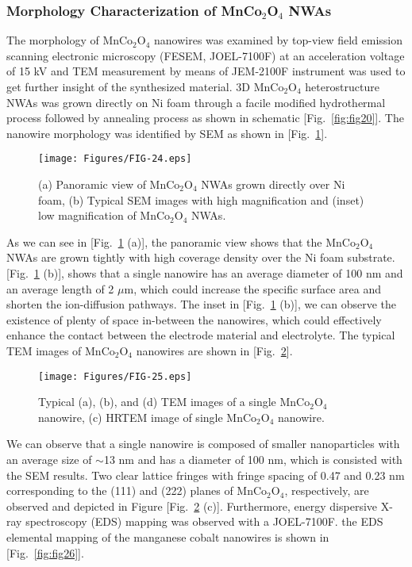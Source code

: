 \documentclass[reprint,amsmath,amssymb,aps,floatfix,
]{revtex4-2}
\begin{document}
\subsubsection{Morphology Characterization of MnCo$_2$O$_4$ NWAs}
The morphology of MnCo$_2$O$_4$ nanowires was examined by top-view field emission scanning electronic microscopy (FESEM, JOEL-7100F) at an acceleration voltage of 15 kV and TEM measurement by means of JEM-2100F instrument was used to get further insight of the synthesized material. 3D MnCo$_2$O$_4$ heterostructure NWAs was grown directly on Ni foam through a facile modified hydrothermal process followed by annealing process as shown in schematic [Fig.~\ref{fig:fig20}]. The nanowire morphology was identified by SEM as shown in [Fig.~\ref{fig:fig24}].
\begin{figure}[b]
    \centering
    \texttt{[image: Figures/FIG-24.eps]}
    \caption{\label{fig:fig24}(a) Panoramic view of MnCo$_2$O$_4$ NWAs grown directly over Ni foam, (b) Typical SEM images with high magnification and (inset) low magnification of MnCo$_2$O$_4$ NWAs.}
    \end{figure}
As we can see in [Fig.~\ref{fig:fig24} (a)], the panoramic view shows that the MnCo$_2$O$_4$ NWAs are grown tightly with high coverage density over the Ni foam substrate. [Fig.~\ref{fig:fig24} (b)], shows that a single nanowire has an average diameter of 100 nm and an average length of 2 $\mu$m, which could increase the specific surface area and shorten the ion-diffusion pathways. The inset in [Fig.~\ref{fig:fig24} (b)], we can observe the existence of plenty of space in-between the nanowires, which could effectively enhance the contact between the electrode material and electrolyte. The typical TEM images of MnCo$_2$O$_4$ nanowires are shown in [Fig.~\ref{fig:fig25}].
\begin{figure}[t]
    \centering
    \texttt{[image: Figures/FIG-25.eps]}
    \caption{\label{fig:fig25}Typical (a), (b), and (d) TEM images of a single MnCo$_2$O$_4$ nanowire, (c) HRTEM image of single MnCo$_2$O$_4$ nanowire.}
    \end{figure}
We can observe that a single nanowire is composed of smaller nanoparticles with an average size of $\sim$13 nm and has a diameter of 100 nm, which is consisted with the SEM results. Two clear lattice fringes with fringe spacing of 0.47 and 0.23 nm corresponding to the (111) and (222) planes of MnCo$_2$O$_4$, respectively, are observed and depicted in Figure [Fig.~\ref{fig:fig25} (c)].
Furthermore, energy dispersive X-ray spectroscopy (EDS) mapping was observed with a JOEL-7100F. the EDS elemental mapping of the manganese cobalt nanowires is shown in [Fig.~\ref{fig:fig26}].
\end{document}
